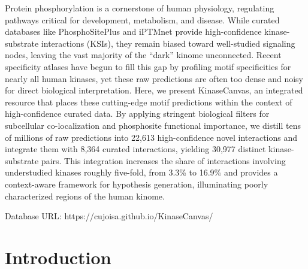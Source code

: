 \documentclass[
  number,
  preprint,
  onecolumn]{elsarticle}
\begin{document}
Protein phosphorylation is a cornerstone of human physiology, regulating
pathways critical for development, metabolism, and disease. While
curated databases like PhosphoSitePlus and iPTMnet provide
high-confidence kinase-substrate interactions (KSIs), they remain biased
toward well-studied signaling nodes, leaving the vast majority of the
``dark'' kinome unconnected. Recent specificity atlases have begun to
fill this gap by profiling motif specificities for nearly all human
kinases, yet these raw predictions are often too dense and noisy for
direct biological interpretation. Here, we present KinaseCanvas, an
integrated resource that places these cutting-edge motif predictions
within the context of high-confidence curated data. By applying
stringent biological filters for subcellular co-localization and
phosphosite functional importance, we distill tens of millions of raw
predictions into 22,613 high-confidence novel interactions and integrate
them with 8,364 curated interactions, yielding 30,977 distinct
kinase-substrate pairs. This integration increases the share of
interactions involving understudied kinases roughly five-fold, from
3.3\% to 16.9\% and provides a context-aware framework for hypothesis
generation, illuminating poorly characterized regions of the human
kinome.

Database URL: https://cujoisa.github.io/KinaseCanvas/

\section{Introduction}\label{introduction}
\end{document}
